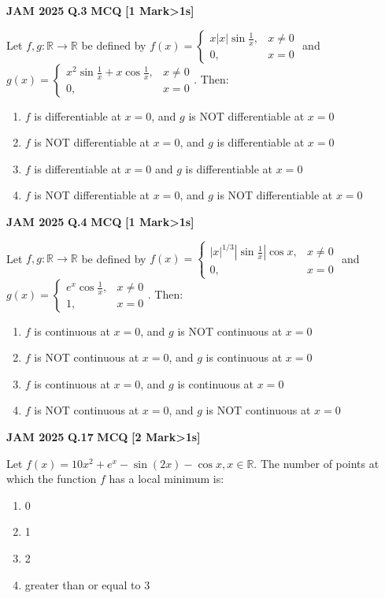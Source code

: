 \documentclass[11pt,a4paper]{article}
\newcommand{\pyqheader}[4]{%
    \noindent\begin{tcolorbox}[
        colback=badgebg,
        colframe=secondary,
        arc=2mm,
        boxrule=0.6pt,
        top=1.5mm,bottom=1.5mm,left=2mm,right=2mm
    ]
        \textbf{\textcolor{primary}{JAM #1}} \hfill \textbf{Q.#2} \hfill \textsc{\textbf{#3}} \hfill \textbf{[#4 Mark\ifnum#4>1s\fi]}
    \end{tcolorbox}\vspace{-1mm}
}
\begin{document}
\pyqheader{2025}{3}{MCQ}{1}
Let $f,g:\mathbb{R}\rightarrow\mathbb{R}$ be defined by $f(x)=\begin{cases}x|x|\sin\frac{1}{x},& x\ne 0\\ 0,& x=0\end{cases}$ and $g(x)=\begin{cases}x^{2}\sin\frac{1}{x}+x\cos\frac{1}{x},& x\ne 0\\ 0,& x=0\end{cases}$. Then:
\begin{enumerate}[label=(\Alph*)]
    \item $f$ is differentiable at $x=0$, and $g$ is NOT differentiable at $x=0$
    \item $f$ is NOT differentiable at $x=0$, and $g$ is differentiable at $x=0$
    \item $f$ is differentiable at $x=0$ and $g$ is differentiable at $x=0$
    \item $f$ is NOT differentiable at $x=0$, and $g$ is NOT differentiable at $x=0$
\end{enumerate}

\pyqheader{2025}{4}{MCQ}{1}
Let $f,g:\mathbb{R}\rightarrow\mathbb{R}$ be defined by $f(x)=\begin{cases}|x|^{1/3}|\sin\frac{1}{x}|\cos x,& x\ne 0\\ 0,& x=0\end{cases}$ and $g(x)=\begin{cases}e^{x}\cos\frac{1}{x},& x\ne 0\\ 1,& x=0\end{cases}$. Then:
\begin{enumerate}[label=(\Alph*)]
    \item $f$ is continuous at $x=0$, and $g$ is NOT continuous at $x=0$
    \item $f$ is NOT continuous at $x=0$, and $g$ is continuous at $x=0$
    \item $f$ is continuous at $x=0$, and $g$ is continuous at $x=0$
    \item $f$ is NOT continuous at $x=0$, and $g$ is NOT continuous at $x=0$
\end{enumerate}

\pyqheader{2025}{17}{MCQ}{2}
Let $f(x)=10x^{2}+e^{x}-\sin(2x)-\cos x, x\in\mathbb{R}$. The number of points at which the function $f$ has a local minimum is:
\begin{enumerate}[label=(\Alph*)]
    \item 0
    \item 1
    \item 2
    \item greater than or equal to 3
\end{enumerate}
\end{document}
